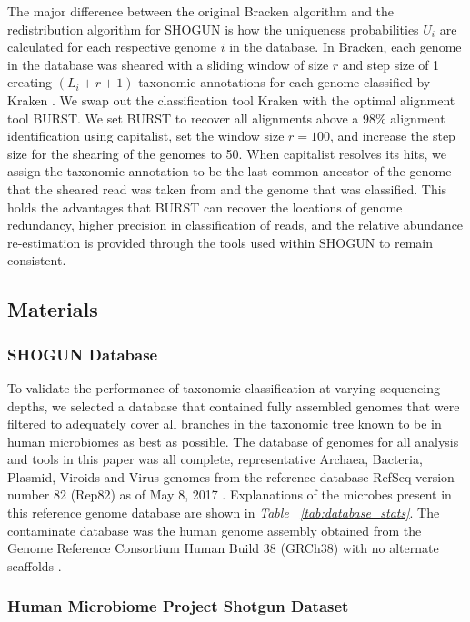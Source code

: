 The major difference between the original Bracken algorithm and the redistribution algorithm for SHOGUN is how the uniqueness probabilities $U_i$ are calculated for each respective genome $i$ in the database. In Bracken, each genome in the database was sheared with a sliding window of size $r$ and step size of 1 creating $(L_i + r + 1)$ taxonomic annotations for each genome classified by Kraken \cite{wood_kraken:_2014}. We swap out the classification tool Kraken with the optimal alignment tool BURST. We set BURST to recover all alignments above a 98\% alignment identification using capitalist, set the window size $r=100$, and increase the step size for the shearing of the genomes to 50. When capitalist resolves its hits, we assign the taxonomic annotation to be the last common ancestor of the genome that the sheared read was taken from and the genome that was classified. This holds the advantages that BURST can recover the locations of genome redundancy, higher precision in classification of reads, and the relative abundance re-estimation is provided through the tools used within SHOGUN to remain consistent.

\subsection{Materials}

\subsubsection{SHOGUN Database}

To validate the performance of taxonomic classification at varying sequencing depths, we selected a database that contained fully assembled genomes that were filtered to adequately cover all branches in the taxonomic tree known to be in human microbiomes as best as possible. The database of genomes for all analysis and tools in this paper was all complete, representative Archaea, Bacteria, Plasmid, Viroids and Virus genomes from the reference database RefSeq version number 82 (Rep82) as of May 8, 2017 \cite{tatusova_refseq_2014}. Explanations of the microbes present in this reference genome database are shown in \textit{Table ~\ref{tab:database_stats}}. The contaminate database was the human genome assembly obtained from the Genome Reference Consortium Human Build 38 (GRCh38) with no alternate scaffolds \cite{staff_introducing_2013}.

\subsubsection{Human Microbiome Project Shotgun Dataset}

